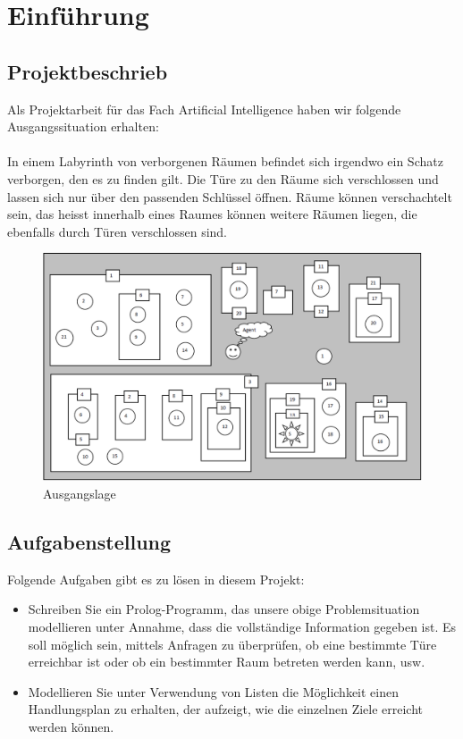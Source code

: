 \chapter{Einführung}

\section{Projektbeschrieb}
Als Projektarbeit für das Fach Artificial Intelligence haben wir folgende Ausgangssituation
erhalten:\\
\\
\noindent
In einem Labyrinth von verborgenen Räumen befindet sich irgendwo ein Schatz verborgen, 
den es zu finden gilt. Die Türe zu den Räume sich verschlossen und lassen sich nur über 
den passenden Schlüssel öffnen. Räume können verschachtelt sein, das heisst innerhalb 
eines Raumes können weitere Räumen liegen, die ebenfalls durch Türen verschlossen sind.

\begin{figure}[h]
    \begin{center}
        \includegraphics[width=1\textwidth]{content/pictures/situation.png}
        \caption{Ausgangslage}
        \label{fig:situation}
    \end{center}
\end{figure}

\section{Aufgabenstellung}
Folgende Aufgaben gibt es zu lösen in diesem Projekt:
\begin{itemize}
    \item Schreiben Sie ein Prolog-Programm, das unsere obige Problemsituation modellieren unter Annahme, 
    dass die vollständige Information gegeben ist. Es soll möglich sein, mittels Anfragen zu 
    überprüfen, ob eine bestimmte Türe erreichbar ist oder ob ein bestimmter Raum betreten 
    werden kann, usw.
    \item Modellieren Sie unter Verwendung von Listen die Möglichkeit einen Handlungsplan zu erhalten, 
    der aufzeigt, wie die einzelnen Ziele erreicht werden können.
\end{itemize}
\newpage

